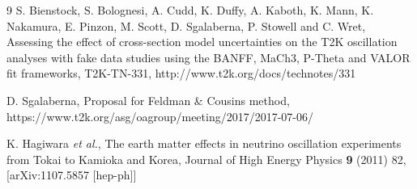 \begin{thebibliography}{9}
   S. Bienstock, S. Bolognesi, A. Cudd, K. Duffy, A. Kaboth, K. Mann, K. Nakamura, E. Pinzon, M. Scott, D. Sgalaberna, P. Stowell and C. Wret,
   Assessing the effect of cross-section model uncertainties on the T2K oscillation analyses with fake data studies using the BANFF, MaCh3, P-Theta and VALOR fit frameworks,
   T2K-TN-331,
   http://www.t2k.org/docs/technotes/331

   D. Sgalaberna,
   Proposal for Feldman \& Cousins method,
   https://www.t2k.org/asg/oagroup/meeting/2017/2017-07-06/

   K. Hagiwara {\it et al.},
   The earth matter effects in neutrino oscillation experiments from Tokai to Kamioka and Korea,
   Journal of High Energy Physics {\bf 9} (2011) 82,
   [arXiv:1107.5857 [hep-ph]]

\end{thebibliography}



